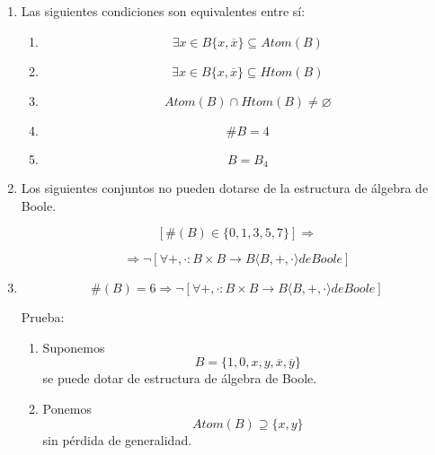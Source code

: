 \begin{enumerate}
\begin{enumerate}
\begin{enumerate}
\begin{enumerate}
        \[\varphi:{B\rightarrow B}'::x\mapsto\varphi{(x)} ≔ \begin{Bmatrix}
        {0'\Leftarrow{x = 0}} \\
        {1'\Leftarrow{x = 1}} \\
        {a'\Leftarrow{x = a}} \\
        {\overline{a'}\Leftarrow{x = \overline{a}}}
        \end{Bmatrix}\]
      \end{enumerate}
    \item
      Las siguientes condiciones son equivalentes entre sí:

      \begin{enumerate}
      \def\labelenumiv{\arabic{enumiv}.}
      \tightlist
      \item
        \[\exists{x \in B}{{\{{x,\overline{x}}\}} \subseteq {\mathit{Atom}{(B)}}}\]
      \item
        \[\exists{x \in B}{{\{{x,\overline{x}}\}} \subseteq {\mathit{Htom}{(B)}}}\]
      \item
        \[\mathit{Atom}{{(B)} \cap \mathit{Htom}}{{(B)} \neq \varnothing}\]
      \item
        \[\#{B = 4}\]
      \item
        \[B = B_{4}\]
      \end{enumerate}
    \item
      Los siguientes conjuntos no pueden dotarse de la estructura de
      álgebra de Boole.

      \[\left\lbrack {{\#{(B)}} \in {\{{0,1,3,5,7}\}}} \right\rbrack\Rightarrow\]

      \[\Rightarrow{\neg\left\lbrack {\forall + , \cdot :{{B \times B}\rightarrow B}{\langle{B, + , \cdot}\rangle}\mathit{de}\mathit{Boole}} \right\rbrack}\]
    \item
      \[{{\#{(B)}} = 6}\Rightarrow{\neg\left\lbrack {\forall + , \cdot :{{B \times B}\rightarrow B}{\langle{B, + , \cdot}\rangle}\mathit{de}\mathit{Boole}} \right\rbrack}\]

      Prueba:

      \begin{enumerate}
      \def\labelenumiv{\arabic{enumiv}.}
      \item
        Suponemos\[B = {\{{1,0,x,y,\overline{x},\overline{y}}\}}\]se
        puede dotar de estructura de álgebra de Boole.
      \item
        Ponemos\[\mathit{Atom}{{(B)} \supseteq {\{{x,y}\}}}\] sin
        pérdida de generalidad.


\end{enumerate}
\end{enumerate}
\end{enumerate}
\end{enumerate}

